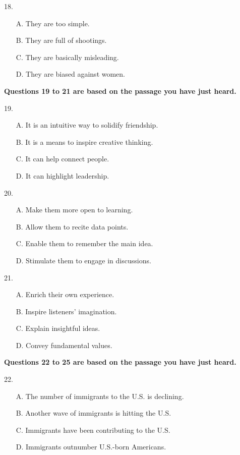 \documentclass[UTF8,11pt]{ctexart}
\begin{document}
18.


\begin{itemize}[leftmargin=2em,itemsep=.2em,topsep=.4em]\item[A.] They are too simple.
\item[B.] They are full of shootings.
\item[C.] They are basically misleading.
\item[D.] They are biased against women.
\end{itemize}

\textbf{Questions 19 to 21 are based on the passage you have just heard.}


19.


\begin{itemize}[leftmargin=2em,itemsep=.2em,topsep=.4em]\item[A.] It is an intuitive way to solidify friendship.
\item[B.] It is a means to inspire creative thinking.
\item[C.] It can help connect people.
\item[D.] It can highlight leadership.
\end{itemize}

20.


\begin{itemize}[leftmargin=2em,itemsep=.2em,topsep=.4em]\item[A.] Make them more open to learning.
\item[B.] Allow them to recite data points.
\item[C.] Enable them to remember the main idea.
\item[D.] Stimulate them to engage in discussions.
\end{itemize}

21.


\begin{itemize}[leftmargin=2em,itemsep=.2em,topsep=.4em]\item[A.] Enrich their own experience.
\item[B.] Inspire listeners’ imagination.
\item[C.] Explain insightful ideas.
\item[D.] Convey fundamental values.
\end{itemize}

\textbf{Questions 22 to 25 are based on the passage you have just heard.}


22.


\begin{itemize}[leftmargin=2em,itemsep=.2em,topsep=.4em]\item[A.] The number of immigrants to the U.S. is declining.
\item[B.] Another wave of immigrants is hitting the U.S.
\item[C.] Immigrants have been contributing to the U.S.
\item[D.] Immigrants outnumber U.S.-born Americans.
\end{itemize}
\end{document}
